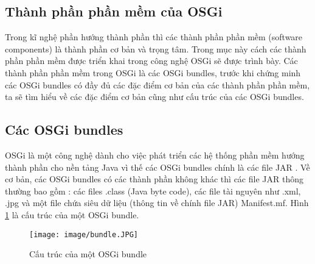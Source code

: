 \subsection{Thành phần phần mềm của OSGi}
Trong kĩ nghệ phần hướng thành phần thì các thành phần phần mềm (software components) là thành phần cơ bản và trọng tâm. Trong mục này cách các thành phần phần mềm được triển khai trong công nghệ OSGi sẽ được trình bày.
Các thành phần phần mềm trong OSGi là các OSGi bundles, trước khi chứng minh các OSGi bundles có đầy đủ các đặc điểm cơ bản của các thành phần phần mềm, ta sẽ tìm hiểu về các đặc điểm cơ bản cũng như cấu trúc của các OSGi bundles.
\subsection{Các OSGi bundles \cite{osgicore5}}
OSGi là một công nghệ dành cho việc phát triển các hệ thống phần mềm hướng thành phần cho nền tảng Java vì thế các OSGi bundles chính là các file JAR \cite{jar}. Về cơ bản, các OSGi bundles có các thành phần không khác thì các file JAR thông thường bao gồm : các files .class (Java byte code), các file tài nguyên như .xml, .jpg và một file chứa siêu dữ liệu (thông tin về chính file JAR) Manifest.mf. Hình \ref{fig:bundle} là cấu trúc của một OSGi bundle.
\begin{figure}[htbp]
	\centering
		\texttt{[image: image/bundle.JPG]}
	\caption{Cấu trúc của một OSGi bundle}
	\label{fig:bundle}
\end{figure}
 
